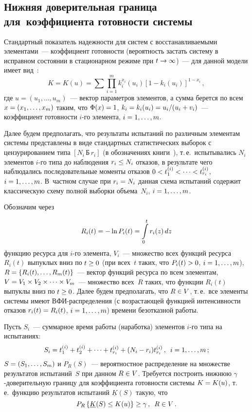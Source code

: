 \begin{multicols}{2}
\vspace*{-6pt}

\section{Нижняя доверительная граница для~коэффициента 
готовности системы}

     Стандартный показатель надежности для систем с восстанавливаемыми 
элементами~--- коэффициент готовности (вероятность застать систему в 
исправном состоянии в стационарном режиме при $t\hm\to\infty$)~--- для 
данной модели имеет вид~\cite{1-pav, 2-pav}:
     $$
     K=K(u) = \sum \prod\limits_{i=1}^m k_i^{x_i}(u_i) \left[ 1-
k_i(u_i)\right]^{1-x_i}\,,
     $$
где $u=(u_1, \ldots , u_m)$~--- вектор параметров элементов, а сумма берется 
по всем $x\hm= (x_1,\ldots , x_m)$ таким, что $\Phi(x) \hm= 1$, $k_i\hm= 
k_i(u_i) \hm = u_i/(u_i+v_i)$~--- коэффициент готовности $i$-го элемента, 
$i\hm= 1,\ldots ,m$.
     
     Далее будем предполагать, что результаты испытаний по различным 
элементам системы пред\-став\-ле\-ны в виде стандартных статистических 
выборок с цензурированием типа $\left [N_i\, \mathrm{Б}\, r_i\right]$ (в обозначениях 
     книги~\cite{3-pav}), т.\,е.\ испытывались $N_i$ элементов $i$-го типа 
до наблюдения $r_i\hm\leq N_i$ отказов, в результате чего наблюдались 
последовательные моменты отказов $0\hm< t_1^{(i)} <  \cdots < 
t_{r_i}^{(i)}$, $i\hm=1, \ldots , m$. В~частном случае при $r_i\hm =N_i$ 
данная схема испытаний содержит классическую схему полной выборки 
объема~$N_i$, $i\hm= 1,\ldots ,m$.
     
     Обозначим через 
     
\noindent
     $$
     R_i(t) \hm = -\ln P_i(t) \hm= \int\limits_0^t r_i(z)\, dz$$ 
     функцию ресурса для $i$-го элемента, $V_i$~--- множество 
всех функций ресурса $R_i(t)$  выпуклых вниз по $t\hm\geq 0$ (при всех~$t$  
таких, что $P_i(t)\hm >0$, $i\hm= 1,\ldots , m$), $R\hm = \left\{ R_i(t),\ldots , 
R_m(t)\right\}$~--- вектор функций ресурса по всем элементам, $V\hm= 
V_1\times V_2 \times \cdots \times V_m$~--- множество всех~$R$ таких, что 
функции $R_i(t)$ выпуклы вниз по $t\hm \geq 0$. Далее будем предполагать, 
что $R\hm\in V$, т.\,е.\ все элементы сис\-те\-мы имеют 
     ВФИ-рас\-пре\-де\-ле\-ния (с воз\-рас\-таю\-щей функцией интенсивности 
отказов $r_i(t)\hm= R_i(t)$, $i\hm= 1,\ldots , m$) времени безотказной работы. 
     
     Пусть $S_i$~--- суммарное время работы (наработка) элементов $i$-го 
типа на испытаниях: 
$$
S_i\hm= t_1^{(i)}+ t_2^{(i)} +\cdots + t^{(i)}_{r_i} 
+ (N_i\hm-r_i) t_{r_i}^{(i)}\,,\enskip i\hm= 1,\ldots , m\,;
$$
$S\hm= (S_1,\ldots , 
S_m)$ и $P_R(S)$~--- вероятностное распределение на множестве результатов 
испытаний~$S$ при данном $R\hm\in V$. Требуется построить нижнюю 
$\gamma$-до\-ве\-ри\-тель\-ную границу для коэффициента го\-тов\-ности 
     сис\-те\-мы $K\hm= K(u)$, т.\,е.\ функцию результатов испытаний 
$\underline{K}(S)$  такую, что 
$$
P_R\left\{ \underline{K}(S)\leq 
K(u)\right\} \geq \gamma\,,\enskip  R\in V\,.
$$
     

\end{multicols}
